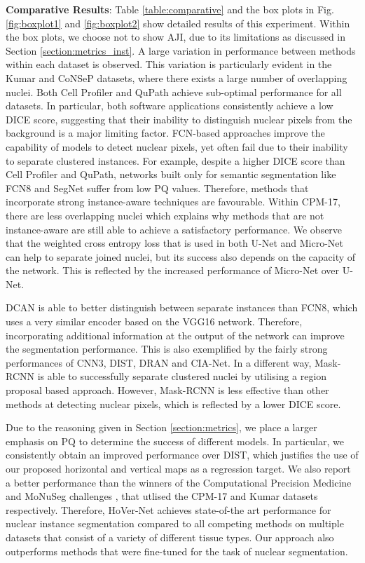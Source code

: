 \documentclass[journal]{IEEEtran}
\begin{document}
	\textbf{Comparative Results}: Table \ref{table:comparative} and the box plots in Fig. \ref{fig:boxplot1} and \ref{fig:boxplot2} show detailed results of this experiment. Within the box plots, we choose not to show AJI, due to its limitations as discussed in Section \ref{section:metrics_inst}. A large variation in performance between methods within each dataset is observed. This variation is particularly evident in the Kumar and CoNSeP datasets, where there exists a large number of overlapping nuclei. Both Cell Profiler \cite{carpenter2006cellprofiler} and QuPath \cite{bankhead2017qupath}  achieve sub-optimal performance for all datasets. In particular, both software applications consistently achieve a low DICE score, suggesting that their inability to distinguish nuclear pixels from the background is a major limiting factor. FCN-based approaches improve the capability of models to detect nuclear pixels, yet often fail due to their inability to separate clustered instances. For example, despite a higher DICE score than Cell Profiler and QuPath, networks built only for semantic segmentation like FCN8 and SegNet suffer from low PQ values. Therefore, methods that incorporate strong instance-aware techniques are favourable. Within CPM-17, there are less overlapping nuclei which explains why methods that are not instance-aware are still able to achieve a satisfactory performance. We observe that the weighted cross entropy loss that is used in both U-Net and Micro-Net can help to separate joined nuclei, but its success also depends on the capacity of the network. This is reflected by the increased performance of Micro-Net over U-Net. 

	DCAN is able to better distinguish between separate instances than FCN8, which uses a very similar encoder based on the VGG16 network. Therefore, incorporating additional information at the output of the network can improve the segmentation performance. This is also exemplified by the fairly strong performances of CNN3, DIST, DRAN and CIA-Net. In a different way, Mask-RCNN is able to successfully separate clustered nuclei by utilising a region proposal based approach. However, Mask-RCNN is less effective than other methods at detecting nuclear pixels, which is reflected by a lower DICE score.
	
	Due to the reasoning given in Section \ref{section:metrics}, we place a larger emphasis on PQ to determine the success of different models. In particular, we consistently obtain an improved performance over DIST, which justifies the use of our proposed horizontal and vertical maps as a regression target. We also report a better performance than the winners of the Computational Precision Medicine and MoNuSeg challenges \cite{vu2018methods, zhou2019cia}, that utlised the CPM-17 and Kumar datasets respectively. Therefore, HoVer-Net achieves state-of-the art performance for nuclear instance segmentation compared to all competing methods on multiple datasets that consist of a variety of different tissue types. Our approach also outperforms methods that were fine-tuned for the task of nuclear segmentation. 
	
\end{document}
